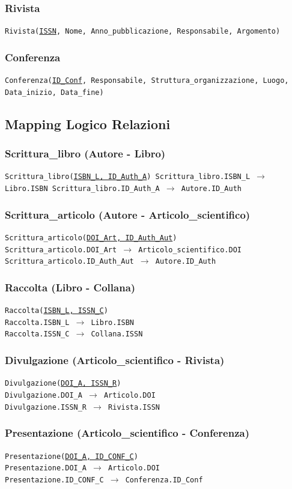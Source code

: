 \documentclass[a4paper, 15pt, oneside]{article}
\begin{document}
	\subsubsection{Rivista}
	\texttt{Rivista(\underline{ISSN}, Nome, Anno\_pubblicazione, Responsabile, Argomento)}
	\subsubsection{Conferenza}
	\texttt{Conferenza(\underline{ID\_Conf}, Responsabile, Struttura\_organizzazione, Luogo, Data\_inizio, Data\_fine)}
	\subsection{Mapping Logico Relazioni}
	\subsubsection{Scrittura\_libro (Autore - Libro)}
	\texttt{Scrittura\_libro(\underline{ISBN\_L, ID\_Auth\_A})
		\tabto{50pt} Scrittura\_libro.ISBN\_L $\longrightarrow$ Libro.ISBN
		\tabto{50pt} Scrittura\_libro.ID\_Auth\_A $\longrightarrow$ Autore.ID\_Auth}
	\subsubsection{Scrittura\_articolo (Autore - Articolo\_scientifico)}
	\texttt{Scrittura\_articolo(\underline{DOI\_Art, ID\_Auth\_Aut})\\
		\tabto{50pt}Scrittura\_articolo.DOI\_Art $\longrightarrow$ Articolo\_scientifico.DOI\\
		\tabto{50pt}Scrittura\_articolo.ID\_Auth\_Aut $\longrightarrow$ Autore.ID\_Auth}
	\subsubsection{Raccolta (Libro - Collana)}
	\texttt{Raccolta(\underline{ISBN\_L, ISSN\_C})\\
		\tabto{50pt} Raccolta.ISBN\_L $\longrightarrow$ Libro.ISBN\\
		\tabto{50pt} Raccolta.ISSN\_C $\longrightarrow$ Collana.ISSN}
	\subsubsection{Divulgazione (Articolo\_scientifico - Rivista)}
	\texttt{Divulgazione(\underline{DOI\_A, ISSN\_R})\\
	\tabto{50pt} Divulgazione.DOI\_A $\longrightarrow$ Articolo.DOI\\
	\tabto{50pt} Divulgazione.ISSN\_R $\longrightarrow$ Rivista.ISSN}
	\subsubsection{Presentazione (Articolo\_scientifico - Conferenza)}
	\texttt{Presentazione(\underline{DOI\_A, ID\_CONF\_C})\\
		\tabto{50pt} Presentazione.DOI\_A $\longrightarrow$ Articolo.DOI\\
		\tabto{50pt} Presentazione.ID\_CONF\_C $\longrightarrow$ Conferenza.ID\_Conf}
\end{document}
